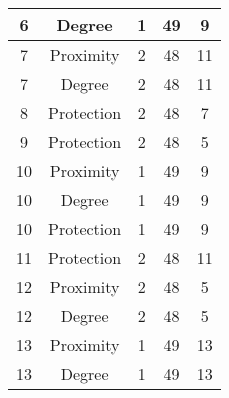 \documentclass[results.tex]{subfiles}
\begin{document}
\begin{center}
\begin{tabular}{| c || c | c | c | c |}
            \hline
            6                       & Degree                       & 1                      & 49                      & 9                    \\
            \hline
            7                       & Proximity                    & 2                      & 48                      & 11                   \\
            \hline
            7                       & Degree                       & 2                      & 48                      & 11                   \\
            \hline
            8                       & Protection                   & 2                      & 48                      & 7                    \\
            \hline
            9                       & Protection                   & 2                      & 48                      & 5                    \\
            \hline
            10                      & Proximity                    & 1                      & 49                      & 9                    \\
            \hline
            10                      & Degree                       & 1                      & 49                      & 9                    \\
            \hline
            10                      & Protection                   & 1                      & 49                      & 9                    \\
            \hline
            11                      & Protection                   & 2                      & 48                      & 11                   \\
            \hline
            12                      & Proximity                    & 2                      & 48                      & 5                    \\
            \hline
            12                      & Degree                       & 2                      & 48                      & 5                    \\
            \hline
            13                      & Proximity                    & 1                      & 49                      & 13                   \\
            \hline
            13                      & Degree                       & 1                      & 49                      & 13                   \\

\end{tabular}
\end{center}
\end{document}
